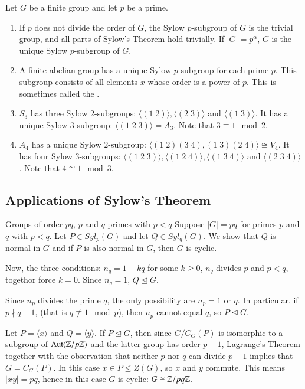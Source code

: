 \documentclass[12pt, a4paper, twoside, openright, titlepage]{book}
\begin{document}
\begin{eg}{}{}
    Let $G$ be a finite group and let $p$ be a prime.
    \begin{enumerate}
        \item If $p$ does not divide the order of $G$, the Sylow $p$-subgroup of $G$ is the trivial group, and all parts of Sylow's Theorem hold trivially. If $|G| = p^{\alpha}$, $G$ is the unique Sylow $p$-subgroup of $G$.
        \item A finite abelian group has a unique Sylow $p$-subgroup for each prime $p$. This subgroup consists of all elements $x$ whose order is a power of $p$. This is sometimes called the .
        \item $S_3$ has three Sylow $2$-subgroups: $\langle (1\;2)\rangle,\langle (2\;3)\rangle$ and $\langle (1\;3)\rangle$. It has a unique Sylow $3$-subgroup: $\langle (1\;2\;3)\rangle = A_3$. Note that $3 \equiv 1 \mod 2$.
        \item $A_4$ has a unique Sylow $2$-subgroup: $\langle (1\;2)(3\;4), (1\;3)(2\;4)\rangle\cong V_4$. It has four Sylow $3$-subgroups: $\langle (1\;2\;3)\rangle,\langle (1\;2\;4)\rangle,\langle (1\;3\;4)\rangle$ and $\langle (2\;3\;4)\rangle$. Note that $4 \cong 1 \mod 3$.
    \end{enumerate}
\end{eg}


\subsection{Applications of Sylow's Theorem}

\begin{eg}{Groups of order $pq$, $p$ and $q$ primes with $p < q$}{}
    Suppose $|G| = pq$ for primes $p$ and $q$ with $p < q$. Let $P \in Syl_p(G)$ and let $Q \in Syl_q(G)$. We show that $Q$ is normal in $G$ and if $P$ is also normal in $G$, then $G$ is cyclic.

    Now, the three conditions: $n_q = 1+kq$ for some $k \geq 0$, $n_q$ divides $p$ and $p < q$, togethor force $k = 0$. Since $n_q = 1$, $Q \trianglelefteq G$.

    Since $n_p$ divides the prime $q$, the only possibility are $n_p = 1$ or $q$. In particular, if $p\nmid q-1$, (that is $q\not\equiv 1 \mod p$), then $n_p$ cannot equal $q$, so $P \trianglelefteq G$.

    Let $P = \langle x \rangle$ and $Q = \langle y \rangle$. If $P \trianglelefteq G$, then since $G/C_G(P)$ is isomorphic to a subgroup of $\operatorname{Aut}(\mathbb Z/p\mathbb Z)$ and the latter group has order $p-1$, Lagrange's Theorem together with the observation that neither $p$ nor $q$ can divide $p-1$ implies that $G = C_G(P)$. In this case $x\in P \leq Z(G)$, so $x$ and $y$ commute. This means $|xy| = pq$, hence in this case $G$ is cyclic: $G\cong \mathbb Z/pq\mathbb Z$.
\end{eg}
\end{document}

